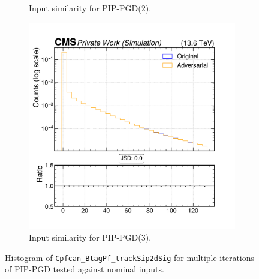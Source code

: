 \begin{figure}[htbp]
\begin{subfigure}[t]{0.32\textwidth}
    \caption*{Input similarity for PIP-PGD(2).}
  \end{subfigure}\hfill
  \begin{subfigure}[t]{0.32\textwidth}
    \includegraphics[width=\linewidth]{media/output/features/compare/combined_it_3/cmp_cpf_arr_Cpfcan_BtagPf_trackSip2dSig.pdf}
    \caption*{Input similarity for PIP-PGD(3).}
  \end{subfigure}

  \caption*{Histogram of \texttt{Cpfcan\_BtagPf\_trackSip2dSig} for multiple iterations of PIP-PGD tested against nominal inputs.}
  \label{fig:combined_input_Cpfcan_BtagPf_trackSip2dSig}
\end{figure}

